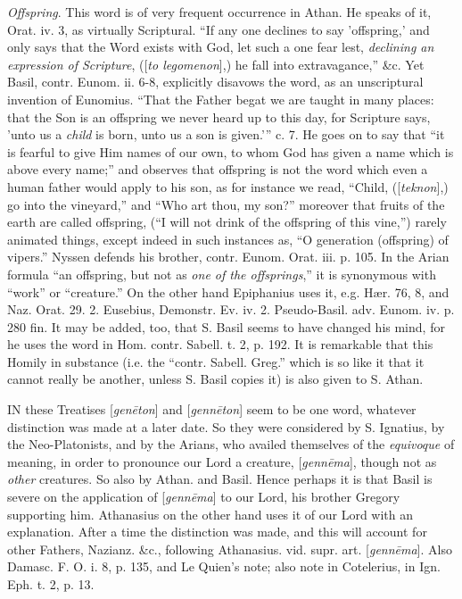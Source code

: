 \xsection{[Gennema]}

\emph{Offspring}. This word is of very frequent
occurrence in Athan. He speaks of it, Orat. iv. 3, as virtually
Scriptural. “If any one declines to say 'offspring,' and only says
that the Word exists with God, let such a one fear lest, \emph{declining
an expression of Scripture}, ([\emph{to legomenon}],) he fall into
extravagance,” \&c. Yet Basil, contr. Eunom. ii. 6-8, explicitly
disavows the word, as an unscriptural invention of Eunomius. “That
the Father begat we are taught in many places: that the Son is an
offspring we never heard up to this day, for Scripture says, 'unto us
a \emph{child} is born, unto us a son is given.'” c. 7. He goes on
to say that “it is fearful to give Him names of our own, to whom God
has given a name which is above every name;” and observes that
offspring is not the word which even a human father would apply to his
son, as for instance we read, “Child, ([\emph{teknon}],) go into the
vineyard,” and “Who art thou, my son?” moreover that fruits of
the earth are called offspring, (“I will not drink of the offspring
of this vine,”) rarely animated things, except indeed in such
instances as, “O generation (offspring) of vipers.” Nyssen defends
his brother, contr. Eunom. Orat. iii. p. 105. In the Arian formula
“an offspring, but not as \emph{one of the offsprings},” it is
synonymous with “work” or “creature.” On the other hand
Epiphanius uses it, e.g. Hær. 76, 8, and Naz. Orat. 29. 2.
Eusebius, Demonstr. Ev. iv. 2. Pseudo-Basil. adv. Eunom. iv. p. 280
fin. It may be added, too, that S. Basil seems to have changed his
mind, for he uses the word in Hom. contr. Sabell. t. 2, p. 192. It is
remarkable that this Homily in substance (i.e. the “contr. Sabell.
Greg.” which is so like it that it cannot really be another, unless
S. Basil copies it) is also given to S. Athan.


IN
these Treatises [\emph{gen\={e}ton}] and [\emph{genn\={e}ton}]
seem to be one word, whatever distinction was made at a later date. So
they were considered by S. Ignatius, by the Neo-Platonists, and by the
Arians, who availed themselves of the \emph{equivoque} of meaning, in
order to pronounce our Lord a creature, [\emph{genn\={e}ma}],
though not as \emph{other} creatures. So also by Athan. and Basil.
Hence perhaps it is that Basil is severe on the application of [\emph{genn\={e}ma}]
to our Lord, his brother Gregory supporting him. Athanasius on the
other hand uses it of our Lord with an explanation. After a time the
distinction was made, and this will account for other Fathers, Nazianz.
\&c., following Athanasius. vid. supr. art. [\emph{genn\={e}ma}].
Also Damasc. F. O. i. 8, p. 135, and Le Quien’s note; also note in
Cotelerius, in Ign. Eph. t. 2, p. 13.

